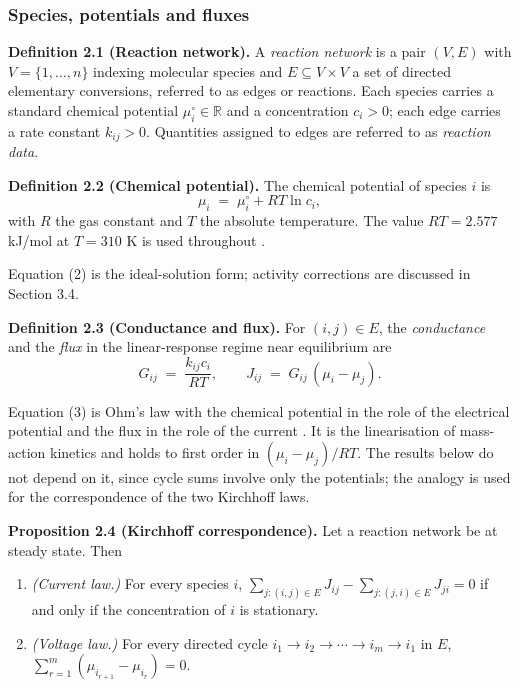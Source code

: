 \documentclass[11pt,a4paper]{article}
\theoremstyle{pstyle}
\theoremstyle{definition}
\theoremstyle{remark}
\newcommand{\R}{\mathbb{R}}
\begin{document}
\subsubsection{Species, potentials and fluxes}

\par\noindent\textbf{Definition 2.1 (Reaction network).}\label{def:network} 
A \emph{reaction network} is a pair $(V,E)$ with $V=\{1,\dots,n\}$
indexing molecular species and $E \subseteq V\times V$ a set of directed
elementary conversions, referred to as edges or reactions. Each species
carries a standard chemical potential $\mu_i^{\circ}\in\R$ and a
concentration $c_i>0$; each edge carries a rate constant $k_{ij}>0$.
Quantities assigned to edges are referred to as \emph{reaction data}.
\par

\par\noindent\textbf{Definition 2.2 (Chemical potential).}\label{def:mu} 
The chemical potential of species $i$ is
\begin{equation}
  \mu_i \;=\; \mu_i^{\circ} + RT\ln c_i,
  \label{eq:mu}
\end{equation}
with $R$ the gas constant and $T$ the absolute temperature. The value
$RT=2.577$ kJ/mol at $T=310$ K is used throughout \citep{atkins2018}.
\par

Equation (2) is the ideal-solution form; activity corrections are
discussed in Section 3.4.

\par\noindent\textbf{Definition 2.3 (Conductance and flux).}\label{def:conductance} 
For $(i,j)\in E$, the \emph{conductance} and the \emph{flux} in the
linear-response regime near equilibrium are
\begin{equation}
  G_{ij} \;=\; \frac{k_{ij}c_i}{RT},
  \qquad
  J_{ij} \;=\; G_{ij}\,(\mu_i - \mu_j).
  \label{eq:GJ}
\end{equation}
\par

Equation (3) is Ohm's law with the chemical potential in the role of
the electrical potential and the flux in the role of the current
\citep{oster1971,beard2002,qian2005}. It is the linearisation of
mass-action kinetics and holds to first order in $(\mu_i-\mu_j)/RT$. The
results below do not depend on it, since cycle sums involve only the
potentials; the analogy is used for the correspondence of the two
Kirchhoff laws.

\par\noindent\textbf{Proposition 2.4 (Kirchhoff correspondence).}\label{prop:kirchhoff} 
Let a reaction network be at steady state. Then
\begin{enumerate}[label=(\roman*),leftmargin=2em,itemsep=2pt]
\item \emph{(Current law.)} For every species $i$,
$\sum_{j:(i,j)\in E} J_{ij} - \sum_{j:(j,i)\in E} J_{ji} = 0$ if and
only if the concentration of $i$ is stationary.
\item \emph{(Voltage law.)} For every directed cycle
$i_1\to i_2\to\cdots\to i_m\to i_1$ in $E$,
$\sum_{r=1}^{m}(\mu_{i_{r+1}}-\mu_{i_r}) = 0$.
\end{enumerate}
\par
\end{document}
